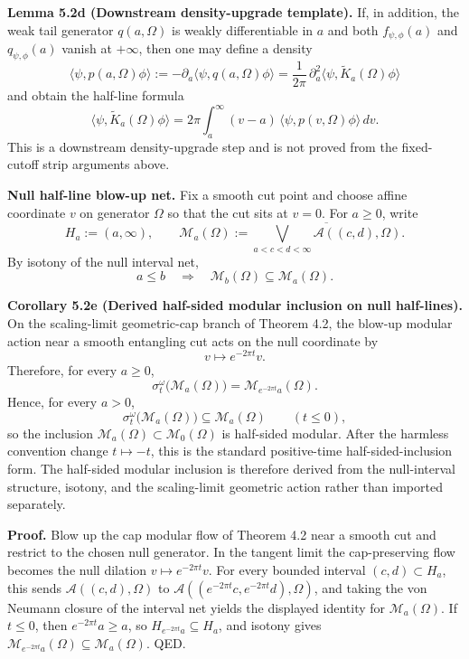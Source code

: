 \textbf{Lemma 5.2d (Downstream density-upgrade template).} If, in addition, the weak tail generator \(q(a,\Omega)\) is weakly differentiable in \(a\) and both \(f_{\psi,\phi}(a)\) and \(q_{\psi,\phi}(a)\) vanish at \(+\infty\), then one may define a density
\[
\langle\psi,p(a,\Omega)\phi\rangle
:=
-\partial_a\langle\psi,q(a,\Omega)\phi\rangle
=
\frac{1}{2\pi}\,\partial_a^2 \langle\psi,\widetilde K_a(\Omega)\phi\rangle
\]
and obtain the half-line formula
\[
\langle\psi,\widetilde K_a(\Omega)\phi\rangle
=
2\pi\int_a^\infty (v-a)\,\langle\psi,p(v,\Omega)\phi\rangle\,dv.
\]
This is a downstream density-upgrade step and is not proved from the fixed-cutoff strip arguments above.

\textbf{Null half-line blow-up net.} Fix a smooth cut point and choose affine coordinate \(v\) on generator \(\Omega\) so that the cut sits at \(v=0\). For \(a\ge 0\), write
\[
H_a:=(a,\infty),
\qquad
\mathcal M_a(\Omega)
:=
\overline{\bigvee_{a<c<d<\infty}\mathcal A((c,d),\Omega)}.
\]
By isotony of the null interval net,
\[
a\le b
\quad\Longrightarrow\quad
\mathcal M_b(\Omega)\subseteq \mathcal M_a(\Omega).
\]

\textbf{Corollary 5.2e (Derived half-sided modular inclusion on null half-lines).} On the scaling-limit geometric-cap branch of Theorem 4.2, the blow-up modular action near a smooth entangling cut acts on the null coordinate by
\[
v\mapsto e^{-2\pi t}v.
\]
Therefore, for every \(a\ge 0\),
\[
\sigma_t^\omega\bigl(\mathcal M_a(\Omega)\bigr)
=
\mathcal M_{e^{-2\pi t}a}(\Omega).
\]
Hence, for every \(a>0\),
\[
\sigma_t^\omega\bigl(\mathcal M_a(\Omega)\bigr)\subseteq \mathcal M_a(\Omega)
\qquad (t\le 0),
\]
so the inclusion \(\mathcal M_a(\Omega)\subset \mathcal M_0(\Omega)\) is half-sided modular. After the harmless convention change \(t\mapsto -t\), this is the standard positive-time half-sided-inclusion form. The half-sided modular inclusion is therefore derived from the null-interval structure, isotony, and the scaling-limit geometric action rather than imported separately.

\textbf{Proof.} Blow up the cap modular flow of Theorem 4.2 near a smooth cut and restrict to the chosen null generator. In the tangent limit the cap-preserving flow becomes the null dilation \(v\mapsto e^{-2\pi t}v\). For every bounded interval \((c,d)\subset H_a\), this sends \(\mathcal A((c,d),\Omega)\) to \(\mathcal A((e^{-2\pi t}c,e^{-2\pi t}d),\Omega)\), and taking the von Neumann closure of the interval net yields the displayed identity for \(\mathcal M_a(\Omega)\). If \(t\le 0\), then \(e^{-2\pi t}a\ge a\), so \(H_{e^{-2\pi t}a}\subseteq H_a\), and isotony gives \(\mathcal M_{e^{-2\pi t}a}(\Omega)\subseteq \mathcal M_a(\Omega)\). QED.

